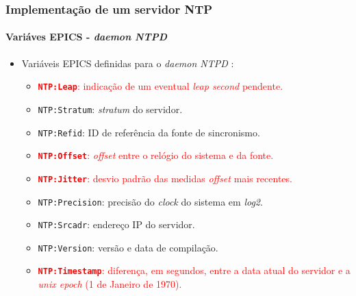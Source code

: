 \documentclass{beamer}
\begin{document}
\begin{frame}
\frametitle{Implementação de um servidor NTP}
\framesubtitle{Variáves EPICS - \textit{daemon NTPD}}

\begin{itemize}
  \item Variáveis EPICS definidas para o \textit{daemon NTPD} :
  
  \vspace{12pt}
  
	\begin{itemize}
	\item  \textcolor{red}{\textbf{\texttt{NTP:Leap}}: indicação de um eventual
	\textit{leap second} pendente.}
	\item \texttt{NTP:Stratum}: \textit{stratum} do servidor.
	\item \texttt{NTP:Refid}: ID de referência da fonte de sincronismo.
	\item \textcolor{red}{\textbf{\texttt{NTP:Offset}}: \textit{offset} entre o
	relógio do sistema e da fonte.}
	\item \textcolor{red}{\textbf{\texttt{NTP:Jitter}}: desvio padrão das medidas
	\textit{offset} mais recentes.}
	\item \texttt{NTP:Precision}: precisão do \textit{clock} do sistema em \textit{log2}.
	\item \texttt{NTP:Srcadr}: endereço IP do servidor. 			
	\item \texttt{NTP:Version}: versão e data de compilação.
	\item \textcolor{red}{\textbf{\texttt{NTP:Timestamp}}: diferença, em segundos,
	entre a data atual do servidor e a \textit{unix epoch} (1 de Janeiro de 1970).}
	\end{itemize}	    
\end{itemize}	

\end{frame}
\end{document}

